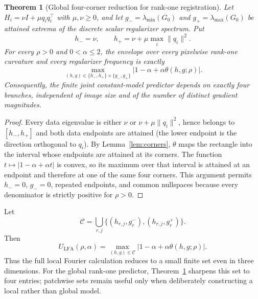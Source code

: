 \documentclass[pdflatex,iicol,sn-mathphys-num]{sn-jnl}
\newtheorem{theorem}{Theorem}[section]
\theoremstyle{definition}\newtheorem{definition}[theorem]{Definition}\newtheorem{remark}[theorem]{Remark}
\begin{document}
\begin{theorem}[Global four-corner reduction for rank-one registration]\label{thm:global_four}
Let $H_i=\nu I+\mu q_iq_i^\top$ with $\mu,\nu\ge0$, and let
$g_-=\lambda_{\min}(G_0)$ and $g_+=\lambda_{\max}(G_0)$ be attained extrema
of the discrete scalar regularizer spectrum. Put
\[
h_-=\nu,\qquad h_+=\nu+\mu\max_i\lVert q_i\rVert^2.
\]
For every $\rho>0$ and $0<\alpha\le2$, the envelope over every pixelwise
rank-one curvature and every regularizer frequency is exactly
\[
 \max_{(h,g)\in\{h_-,h_+\}\times\{g_-,g_+\}}
 \left|1-\alpha+\alpha\theta(h,g;\rho)\right|.
\]
Consequently, the finite joint constant-model predictor depends on exactly
four branches, independent of image size and of the number of distinct
gradient magnitudes.
\end{theorem}
\begin{proof}
Every data eigenvalue is either $\nu$ or
$\nu+\mu\lVert q_i\rVert^2$, hence belongs to $[h_-,h_+]$ and both data
endpoints are attained (the lower endpoint is the direction orthogonal to
$q_i$).  By Lemma~\ref{lem:corners}, $\theta$ maps the rectangle into the
interval whose endpoints are attained at its corners.  The function
$t\mapsto|1-\alpha+\alpha t|$ is convex, so its maximum over that interval is
attained at an endpoint and therefore at one of the same four corners.
This argument permits $h_-=0$, $g_-=0$, repeated endpoints, and common
nullspaces because every denominator is strictly positive for $\rho>0$.
\end{proof}

Let
\begin{equation}
\mathcal C=\bigcup_{r,j}
\{(h_{r,j},g_r^-),(h_{r,j},g_r^+)\}.
\label{eq:cornerset}
\end{equation}
Then
\begin{equation}
U_{\mathrm{LFA}}(\rho,\alpha)
=\max_{(h,g)\in\mathcal C}
|1-\alpha+\alpha\theta(h,g;\rho)|.
\label{eq:finite_envelope}
\end{equation}
Thus the full local Fourier calculation reduces to a small finite set even in three dimensions.  For the global rank-one predictor, Theorem~\ref{thm:global_four} sharpens this set to four entries; patchwise sets remain useful only when deliberately constructing a local rather than global model.
\end{document}
